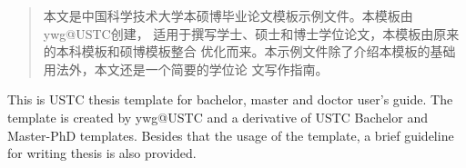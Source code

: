 ﻿\begin{abstract}
本文是中国科学技术大学本硕博毕业论文模板示例文件。本模板由ywg@USTC创建，
适用于撰写学士、硕士和博士学位论文，本模板由原来的本科模板和硕博模板整合
优化而来。本示例文件除了介绍本模板的基础用法外，本文还是一个简要的学位论
文写作指南。

\end{abstract}

\begin{enabstract}
This is USTC thesis template for bachelor, master and doctor user's guide.
The template is created by ywg@USTC and a derivative of USTC Bachelor and
Master-PhD templates. Besides that the usage of the template, a brief guideline
for writing thesis is also provided.

\end{enabstract}

